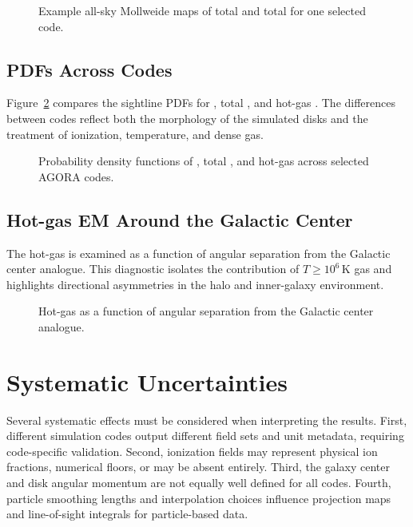 \documentclass[twocolumn]{aastex631}
\newcommand{\DM}{\mathrm{DM}}
\newcommand{\EM}{\mathrm{EM}}
\begin{document}
\begin{figure}
    \centering
    \caption{Example all-sky Mollweide maps of total \DM{} and total \EM{} for one selected code.}
    \label{fig:mollweide}
\end{figure}

\subsection{PDFs Across Codes}
Figure~\ref{fig:pdfs} compares the sightline PDFs for \DM{}, total \EM{}, and hot-gas \EM{}.  The differences between codes reflect both the morphology of the simulated disks and the treatment of ionization, temperature, and dense gas.

\begin{figure}
    \centering
    \caption{Probability density functions of \DM{}, total \EM{}, and hot-gas \EM{} across selected AGORA codes.}
    \label{fig:pdfs}
\end{figure}

\subsection{Hot-gas EM Around the Galactic Center}
The hot-gas \EM{} is examined as a function of angular separation from the Galactic center analogue.  This diagnostic isolates the contribution of $T\geq10^6\,\mathrm{K}$ gas and highlights directional asymmetries in the halo and inner-galaxy environment.

\begin{figure}
    \centering
    \caption{Hot-gas \EM{} as a function of angular separation from the Galactic center analogue.}
    \label{fig:hot_em_angle}
\end{figure}

\section{Systematic Uncertainties}\label{sec:systematics}
Several systematic effects must be considered when interpreting the results.  First, different simulation codes output different field sets and unit metadata, requiring code-specific validation.  Second, ionization fields may represent physical ion fractions, numerical floors, or may be absent entirely.  Third, the galaxy center and disk angular momentum are not equally well defined for all codes.  Fourth, particle smoothing lengths and interpolation choices influence projection maps and line-of-sight integrals for particle-based data.
\end{document}
